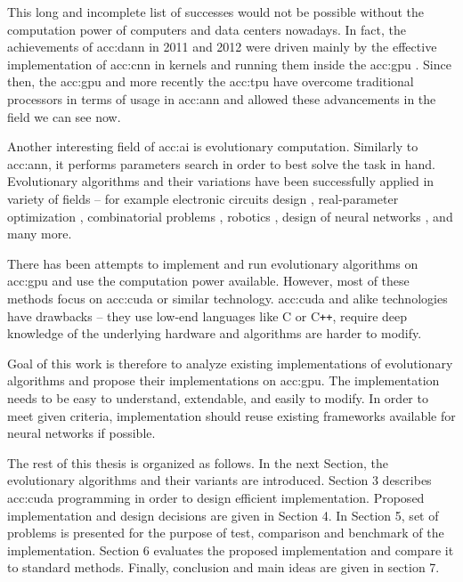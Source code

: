 This long and incomplete list of successes would not be possible without the computation power of computers and data centers nowadays. In fact, the achievements of \acrshort{acc:dann} in 2011 and 2012 were driven mainly by the effective implementation of \acrfull{acc:cnn} in kernels and running them inside the \acrfull{acc:gpu} \cite{CIRESAN2012333}. Since then, the \acrshort{acc:gpu} and more recently the \acrfull{acc:tpu} have overcome traditional processors in terms of usage in \acrshort{acc:ann} and allowed these advancements in the field we can see now.

Another interesting field of \acrlong{acc:ai} is evolutionary computation. Similarly to \acrshort{acc:ann}, it performs parameters search in order to best solve the task in hand. Evolutionary algorithms and their variations have been successfully applied in variety of fields -- for example 
electronic circuits design \cite{NASAantenaDesign}\allowbreak\cite{circuitdesignoptimizationea},
real-parameter optimization \cite{IntroNaturalEvolutionStrategies}, 
combinatorial problems \cite{GeneticAssambleLineBalancingProblem}\allowbreak\cite{ALBAYRAK20111313},\linebreak
robotics \cite{EvolutionaryRobotics}\allowbreak\cite{RoboticsInPhysX}\allowbreak\cite{nygaard2018realworld},
design of neural networks \cite{NEAT}\allowbreak\cite{Floreano2008NeuroevolutionFA},
and many more.

There has been attempts to implement and run evolutionary algorithms on \acrshort{acc:gpu} \cite{cheng2019accelerating}\allowbreak\cite{CHENG2019514} and use the computation power available. However, most of these methods focus on \acrfull{acc:cuda} or similar technology. \acrshort{acc:cuda} and alike technologies have drawbacks -- they use low-end languages like C or C\texttt{++}, require deep knowledge of the underlying hardware and algorithms are harder to modify.

Goal of this work is therefore to analyze existing implementations of evolutionary algorithms and propose their implementations on \acrshort{acc:gpu}. The implementation needs to be easy to understand, extendable, and easily to modify. In order to meet given criteria, implementation should reuse existing frameworks available for neural networks if possible.

The rest of this thesis is organized as follows. 
In the next Section, the evolutionary algorithms and their variants are introduced. 
Section 3 describes \acrshort{acc:cuda} programming in order to  design efficient implementation.
Proposed implementation and design decisions are given in Section 4. 
In Section 5, set of problems is presented for the purpose of test, comparison and benchmark of the implementation.
Section 6 evaluates the proposed implementation and compare it to standard methods.
Finally, conclusion and main ideas are given in section 7.
